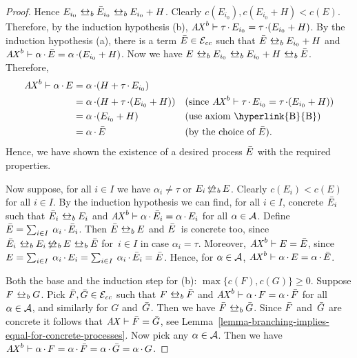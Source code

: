 \begin{proof}
  Hence $E_{i_0} \brbisim \Ebar_{i_0} \brbisim E_{i_0}+H$. Clearly
  $c(E_{i_0}), c(E_{i_0}+H) < c(E)$.  Therefore, by the induction
  hypothesis (b),
  $\mathit{A \mkern-2mu X}^b\vdash \tau \mathop{.} E_{i_0} = \tau \mathop{.} ( E_{i_0} + H )$.  By
  the induction hypothesis (a), there is a term $\bar{E} \in \mathcal{E}_{\mathit{cc}}$
  such that $\Ebar \brbisim E_{i_0} + H$ \vspace{1pt} and
  $\mathit{A \mkern-2mu X}^b\vdash \alpha \mathop{.} \bar{E} = \alpha \mathop{.} ( E_{i_0} + H )$. Now
  we have $E \brbisim E_{i_0} \brbisim E_{i_0} + H \brbisim
  \Ebar$. Therefore,
  \begin{align*}
    \AXdb\vdash\alpha \pref E 
    & = \alpha \pref ( H + \tau \pref E_{i_0} ) 
    && \\
    & = \alpha \pref ( H + \tau \pref ( E_{i_0} + H ) ) 
    && (\text{since $\AXdb\vdash\tau \pref E_{i_0} = \tau \pref
      (E_{i_0} + H)$}) \\ 
    & = \alpha \pref ( E_{i_0} + H ) 
    && (\text{use axiom \hyperlink{B}{B}}) \\
    & = \alpha \pref \Ebar
    && (\text{by the choice of $\Ebar$}).
  \end{align*}
  Hence, we have shown the existence of a desired process $\bar{E}$ with
  the required properties.

  Now suppose, for all $i \in I$ we have $\alpha_i \neq \tau$ or
  $E_i\nbrbisim E$. Clearly $c(E_i) < c(E)$ for all $i \in I$.  By
  the induction hypothesis we can find, for all $i \in I$, concrete
  $\bar{E}_i$ such that $\Ebar_i \brbisim E_i$ and $\mathit{A \mkern-2mu X}^b \vdash \alpha
  \mathop{.} \bar{E}_i = \alpha \mathop{.} E_i$ for all $\alpha \in \mathcal{A}$. Define
  $\bar{E} = { \textstyle\sum_{i {\in} I} \: \alpha_i \mathop{.} \bar{E}_i }$. Then $\Ebar
  \brbisim E$ and $\bar{E}$~is concrete too, since $\Ebar_i \brbisim E_i
  \nbrbisim E \brbisim \Ebar$ for~$i \in I$ in case $\alpha_i = \tau$.
  Moreover, $\mathit{A \mkern-2mu X}^b\vdash E = \bar{E}$, since $E = \textstyle\sum_{i {\in} I} \: \alpha_i
  \mathop{.} E_i = \textstyle\sum_{i {\in} I} \: \alpha_i \mathop{.} \bar{E}_i = \bar{E}$. Hence, for
  $\alpha \in \mathcal{A}$, $\mathit{A \mkern-2mu X}^b \vdash \alpha \mathop{.} E = \alpha \mathop{.}
  \bar{E}$.

  Both the base and the induction step for (b): $\max \lbrace c(F),
  c(G) \rbrace \geqslant 0$. Suppose $F \brbisim G$. Pick $\bar{F},
  \bar{G} \in \mathcal{E}_{\mathit{cc}}$ such that $F \brbisim \Fbar$ and
  $\mathit{A \mkern-2mu X}^b\vdash\alpha \mathop{.} F = \alpha \mathop{.} \bar{F}$ for all~$\alpha \in
  \mathcal{A}$, and similarly for $G$ and~$\bar{G}$. Then we have $\Fbar
  \brbisim \Gbar$. Since $\bar{F}$ and~$\bar{G}$ are concrete it follows
  that $\mathit{A \mkern-2mu X}\vdash\bar{F} = \bar{G}$, see
  Lemma~\ref{lemma-branching-implies-equal-for-concrete-processes}. Now
  pick any $\alpha \in \mathcal{A}$. Then we have $\mathit{A \mkern-2mu X}^b\vdash\alpha \mathop{.} F
  = \alpha \mathop{.} \bar{F} = \alpha \mathop{.} \bar{G} = \alpha \mathop{.} G$.
\end{proof}

